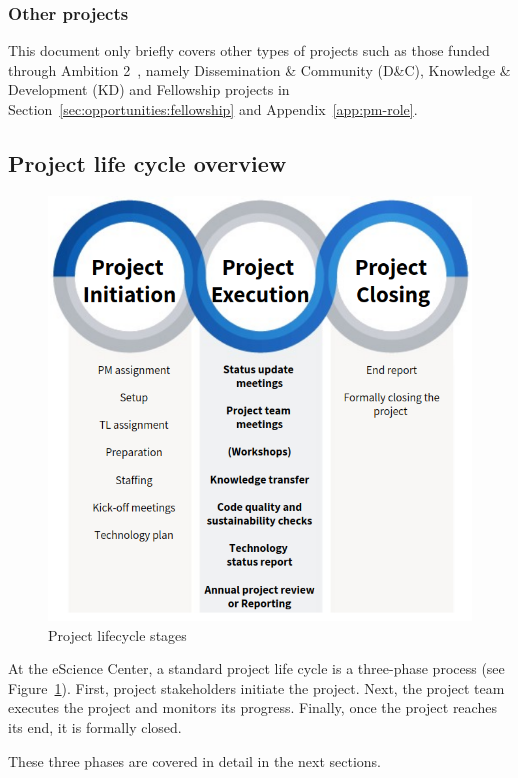 \subsubsection{Other projects}
This document only briefly covers other types of projects such as those funded through Ambition 2~\cite{nlesc-strategy}, namely Dissemination
\& Community (D\&C), Knowledge \& Development (KD) and Fellowship projects in 
Section~\ref{sec:opportunities:fellowship} and Appendix~\ref{app:pm-role}.

\clearpage
\subsection{Project life cycle overview}
\label{sec:scope:lifecycle}

\begin{figure}[!h]
    \centering
    \includegraphics[scale=0.5]{img/lifecycle-stages.png}
    \caption{Project lifecycle stages}
    \label{fig:project-lifecycle}
\end{figure}

At the eScience Center, a standard project life cycle is a three-phase process (see Figure~\ref{fig:project-lifecycle}). First, project stakeholders initiate the
project. Next, the project team executes the project and monitors its progress. Finally, once the project reaches its
end, it is formally closed.

These three phases are covered in detail in the next sections.
